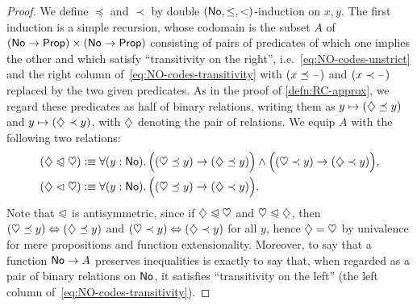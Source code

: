 \begin{proof}
  We define $\preceq$ and $\prec$ by double $(\mathsf{No},\le,<)$-induction on $x,y$.
  The first induction is a simple recursion, whose codomain is the subset $A$ of $(\mathsf{No}\to\mathsf{Prop})\times (\mathsf{No}\to\mathsf{Prop})$ consisting of pairs of predicates of which one implies the other and which satisfy ``transitivity on the right'', i.e.~\eqref{eq:NO-codes-unstrict} and the right column of~\eqref{eq:NO-codes-transitivity} with $(x\preceq \mathord{\hspace{1pt}\text{--}\hspace{1pt}})$ and $(x\prec \mathord{\hspace{1pt}\text{--}\hspace{1pt}})$ replaced by the two given predicates.
  As in the proof of \autoref{defn:RC-approx}, we regard these predicates as half of binary relations, writing them as $y\mapsto (\diamondsuit\preceq y)$ and $y\mapsto (\diamondsuit\prec y)$, with $\diamondsuit$ denoting the pair of relations.
  We equip $A$ with the following two relations:
  \begin{align*}
    (\hlname \ble \hlbname) &\defeq
    \fall{y:\NO} \Big( (\hleb y) \to (\hle y) \Big) \land
    \Big( (\hltb y) \to (\hlt y) \Big),\\
    (\hlname \blt \hlbname) &\defeq
    \fall{y:\NO} \Big( (\hleb y) \to (\hlt y) \Big).
  \end{align*}
  Note that $\trianglelefteqslant$ is antisymmetric, since if $\diamondsuit \trianglelefteqslant \heartsuit$ and $\heartsuit \trianglelefteqslant \diamondsuit$, then $(\heartsuit\preceq y) \Leftrightarrow (\diamondsuit\preceq y)$ and $(\heartsuit\prec y) \Leftrightarrow (\diamondsuit\prec y)$ for all $y$, hence $\diamondsuit=\heartsuit$ by univalence for mere propositions and function extensionality.
  Moreover, to say that a function $\mathsf{No}\to A$ preserves inequalities is exactly to say that, when regarded as a pair of binary relations on $\mathsf{No}$, it satisfies ``transitivity on the left'' (the left column of~\eqref{eq:NO-codes-transitivity}).


\end{proof}
